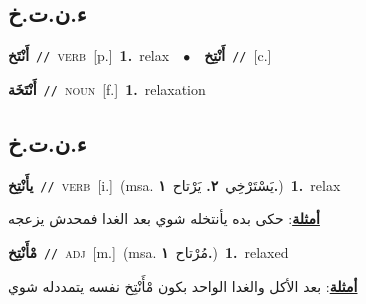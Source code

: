 \documentclass[10pt,a4paper,twoside]{article} %
\begin{document}
\begin{multicols}{2}
\vspace{-3mm}
\subsection*{\color{blue}\foreignlanguage{arabic}{ء.ن.ت.خ}\color{blue}{}} 

{\setlength\topsep{0pt}\textbf{\foreignlanguage{arabic}{أَنْتَخ}}\ {\color{gray}\texttt{//}\color{black}}\ \textsc{verb}\ [p.]\ \textbf{1.}~relax\ \ $\bullet$\ \ \setlength\topsep{0pt}\textbf{\foreignlanguage{arabic}{أَنْتِخ}}\ {\color{gray}\texttt{//}\color{black}}\ [c.]\ } \vspace{2mm}

{\setlength\topsep{0pt}\textbf{\foreignlanguage{arabic}{أَنْتَخَة}}\ {\color{gray}\texttt{//}\color{black}}\ \textsc{noun}\ [f.]\ \textbf{1.}~relaxation\ } \vspace{2mm}

\vspace{-3mm}
\subsection*{\color{blue}\foreignlanguage{arabic}{ء.ن.ت.خ}\color{blue}{ (ntws)}} 

{\setlength\topsep{0pt}\textbf{\foreignlanguage{arabic}{يأَنْتِخ}}\ {\color{gray}\texttt{//}\color{black}}\ \textsc{verb}\ [i.]\ \color{gray}(msa. \foreignlanguage{arabic}{يَسْتَرْخِي}~\foreignlanguage{arabic}{\textbf{٢.}}  \foreignlanguage{arabic}{يَرْتاح}~\foreignlanguage{arabic}{\textbf{١.}})\color{black}\ \textbf{1.}~relax\  \begin{flushright}\color{gray}\foreignlanguage{arabic}{\textbf{\underline{\foreignlanguage{arabic}{أمثلة}}}: حكى بده يأنتخله شوي بعد الغدا فمحدش يزعجه}\end{flushright}\color{black}} \vspace{2mm}

{\setlength\topsep{0pt}\textbf{\foreignlanguage{arabic}{مْأَنْتِخ}}\ {\color{gray}\texttt{//}\color{black}}\ \textsc{adj}\ [m.]\ \color{gray}(msa. \foreignlanguage{arabic}{مُرْتاح}~\foreignlanguage{arabic}{\textbf{١.}})\color{black}\ \textbf{1.}~relaxed\  \begin{flushright}\color{gray}\foreignlanguage{arabic}{\textbf{\underline{\foreignlanguage{arabic}{أمثلة}}}: بعد الأكل والغدا الواحد بكون مْأَنْتِخ نفسه يتمددله شوي}\end{flushright}\color{black}} \vspace{2mm}


\end{multicols}
\end{document}
